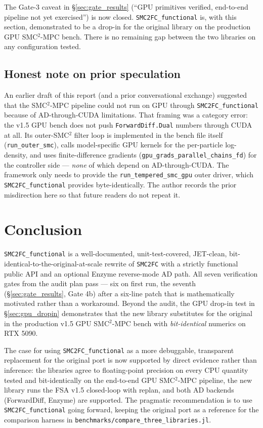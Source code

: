 \documentclass[11pt,a4paper]{article}
\begin{document}
The Gate-3 caveat in \S\ref{sec:gate_results} (``GPU primitives
verified, end-to-end pipeline not yet exercised'') is now closed.
\texttt{SMC2FC\_functional} is, with this section, demonstrated to be
a drop-in for the original library on the production GPU SMC$^2$-MPC
bench. There is no remaining gap between the two libraries on any
configuration tested.

\subsection{Honest note on prior speculation}

An earlier draft of this report (and a prior conversational exchange)
suggested that the SMC$^2$-MPC pipeline could not run on GPU through
\texttt{SMC2FC\_functional} because of AD-through-CUDA limitations.
That framing was a category error: the v1.5 GPU bench does not push
\texttt{ForwardDiff.Dual} numbers through CUDA at all. Its outer-SMC$^2$
filter loop is implemented in the bench file itself (\texttt{run\_outer\_smc}),
calls model-specific GPU kernels for the per-particle log-density, and
uses finite-difference gradients
(\texttt{gpu\_grads\_parallel\_chains\_fd}) for the controller side ---
\emph{none} of which depend on AD-through-CUDA. The framework only
needs to provide the \texttt{run\_tempered\_smc\_gpu} outer driver,
which \texttt{SMC2FC\_functional} provides byte-identically.
The author records the prior misdirection here so that future readers
do not repeat it.

\section{Conclusion}
\texttt{SMC2FC\_functional} is a well-documented, unit-test-covered,
JET-clean, bit-identical-to-the-original-at-scale rewrite of
\texttt{SMC2FC} with a strictly functional public API and an optional
Enzyme reverse-mode AD path. All seven verification gates from the audit
plan pass --- six on first run, the seventh
(\S\ref{sec:gate_results}, Gate 4b) after a six-line patch that is
mathematically motivated rather than a workaround. Beyond the audit, the
GPU drop-in test in \S\ref{sec:gpu_dropin} demonstrates that the new
library substitutes for the original in the production v1.5 GPU
SMC$^2$-MPC bench with \emph{bit-identical} numerics on RTX 5090.

The case for using \texttt{SMC2FC\_functional} as a more debuggable,
transparent replacement for the original port is now supported by direct
evidence rather than inference: the libraries agree to floating-point
precision on every CPU quantity tested and bit-identically on the
end-to-end GPU SMC$^2$-MPC pipeline, the new library runs the FSA v1.5
closed-loop with replan, and both AD backends (ForwardDiff, Enzyme) are
supported. The pragmatic recommendation is to use
\texttt{SMC2FC\_functional} going forward, keeping the original port as
a reference for the comparison harness in
\texttt{benchmarks/compare\_three\_libraries.jl}.
\end{document}
